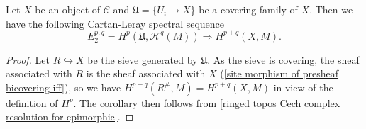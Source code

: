 \begin{corollary}\label{ringed site Leray spectral sequence for covering sieve}
Let $X$ be an object of $\mathcal{C}$ and $\mathfrak{U}=\{U_i\to X\}$ be a covering family of $X$. Then we have the following Cartan-Leray spectral sequence
\begin{equation}\label{ringed site Leray spectral sequence for covering sieve-1}
E_2^{p,q}=H^p(\mathfrak{U},\mathcal{H}^q(M))\Rightarrow H^{p+q}(X,M).
\end{equation}
\end{corollary}
\begin{proof}
Let $R\hookrightarrow X$ be the sieve generated by $\mathfrak{U}$. As the sieve is covering, the sheaf associated with $R$ is the sheaf associated with $X$ (\cref{site morphism of presheaf bicovering iff}), so we have $H^{p+q}(R^\#,M)=H^{p+q}(X,M)$ in view of the definition of $H^p$. The corollary then follows from \cref{ringed topos Cech complex resolution for epimorphic}. 
\end{proof}

